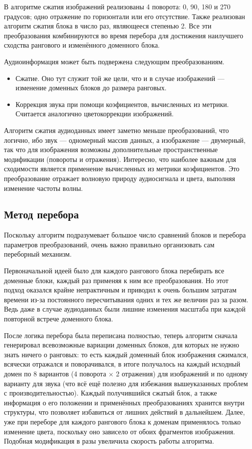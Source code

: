 \documentclass[bachelor,paper]{pmk-graduate}
\theoremstyle{definition}
\begin{document}
В алгоритме сжатия изображений реализованы 4 поворота: 0, 90, 180 и 270 градусов; одно отражение по горизонтали или его отсутствие. Также реализован алгоритм сжатия блока в число раз, являющееся степенью 2. Все эти преобразования комбинируются во время перебора для достижения наилучшего сходства рангового и изменённого доменного блока.

Аудиоинформация может быть подвержена следующим преобразованиям.
\begin{itemize}
  \item Сжатие. Оно тут служит той же цели, что и в случае изображений --- изменение доменных блоков до размера ранговых.
  \item Коррекция звука при помощи коэфициентов, вычисленных из метрики. Считается аналогично цветокоррекции изображений.
\end{itemize}

Алгоритм сжатия аудиоданных имеет заметно меньше преобразований, что логично, ибо звук --- одномерный массив данных, а изображение --- двумерный, так что для изображения возможны дополнительные пространственные модификации (повороты и отражения). Интересно, что наиболее важным для сходимости является применение вычисленных из метрики коэфициентов. Это преобразование отражает волновую природу аудиосигнала и цвета, выполняя изменение частоты волны.

\subsection{Метод перебора}

Поскольку алгоритм подразумевает большое число сравнений блоков и перебора параметров преобразований, очень важно правильно организовать сам переборный механизм.

Первоначальной идеей было для каждого рангового блока перебирать все доменные блоки, каждый раз применяя к ним все преобразования. Но этот подход оказался крайне непрактичным и приводил к очень большим затратам времени из-за постоянного пересчитывания одних и тех же величин раз за разом. Ведь даже в случае аудиоданных были лишние изменения масштаба при каждой повторной встрече доменного блока.

После логика перебора была переписана полностью, теперь алгоритм сначала генерировал всевозможные вариации доменных блоков, для которых не нужно знать ничего о ранговых: то есть каждый доменный блок изображения сжимался, всячески отражался и поворачивался, в итоге получалось на каждый исходный домен по 8 вариантов (4 поворота $\times$ 2 отражения) для изображений и по одному варианту для звука (что всё ещё полезно для избежания вышеуказанных проблем с производительностью). Каждый получившийся сжатый блок, а также информация о его положении и применённых преобразованиях хранится внутри структуры, что позволяет избавиться от лишних действий в дальнейшем. Далее, уже при переборе для каждого рангового блока к доменам применялось только изменение цвета, поскольку оно зависело от обоих фрагментов изображения. Подобная модификация в разы увеличила скорость работы алгоритма.
\end{document}
